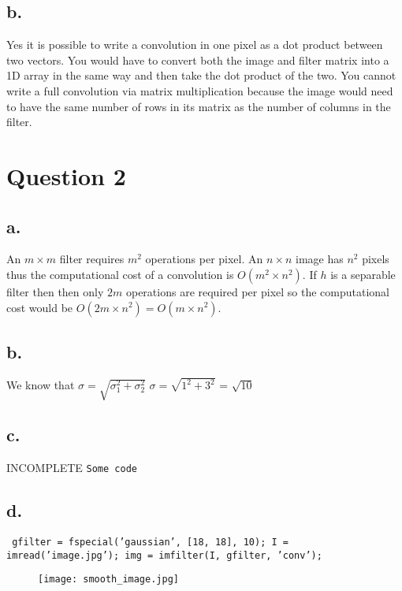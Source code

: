 \documentclass{article}
\begin{document}
\subsection*{b.}

Yes it is possible to write a convolution in one pixel as a dot product between two vectors. You would have to convert both the image and filter matrix into a 1D array in the same way and then take the dot product of the two. You cannot write a full convolution via matrix multiplication because the image would need to have the same number of rows in its matrix as the number of columns in the filter.

\section*{Question 2}

\subsection*{a.}
An $m \times m$ filter requires $m^{2}$ operations per pixel. An $n \times n$ image has $n^{2}$ pixels thus the computational cost of a convolution is $O(m^{2} \times n^{2})$. If $h$ is a separable filter then then only $2m$ operations are required per pixel so the computational cost would be $O(2m \times n^{2}) = O(m \times n^{2})$.

\subsection*{b.}
We know that $\sigma  = \sqrt{\sigma^{2}_{1} + \sigma^{2}_{2}}$
\newline\newline
$\sigma = \sqrt{1^{2} + 3^{2}}$ = $\sqrt{10}$

\subsection*{c.}
INCOMPLETE
\texttt{Some code}

\subsection*{d.}
\texttt{\noindent
gfilter = fspecial('gaussian', [18, 18],  10);
\newline
I = imread('image.jpg');
\newline
img = imfilter(I, gfilter, 'conv');
}

\begin{figure}[h!]
\centering
\texttt{[image: smooth\_image.jpg]}
\label{fig:sample graph}
\end{figure}
\end{document}
